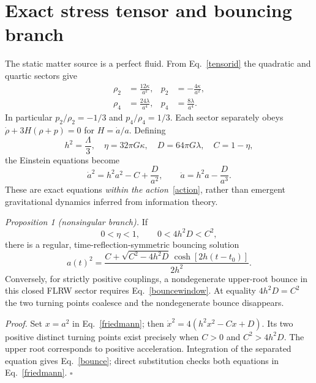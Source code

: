 \documentclass[aps,prd,reprint,longbibliography,nofootinbib,superscriptaddress]{revtex4-2}
\begin{document}
\section{Exact stress tensor and bouncing branch}
The static matter source is a perfect fluid. From Eq.~\eqref{tensorid} the quadratic and quartic sectors give
\begin{align}\label{rho}
\rho_2&=\frac{12\kappa}{a^2},&p_2&=-\frac{4\kappa}{a^2},\\
\rho_4&=\frac{24\lambda}{a^4},&p_4&=\frac{8\lambda}{a^4}.
\end{align}
In particular $p_2/\rho_2=-1/3$ and $p_4/\rho_4=1/3$. Each sector separately obeys $\dot\rho+3H(\rho+p)=0$ for $H=\dot a/a$. Defining
\begin{equation}\label{const}
 h^2=\frac\Lambda3,\quad \eta=32\pi G\kappa,\quad
 D=64\pi G\lambda,\quad C=1-\eta,
\end{equation}
the Einstein equations become
\begin{equation}\label{friedmann}
 \dot a^2=h^2 a^2-C+\frac{D}{a^2},\qquad
 \ddot a=h^2 a-\frac{D}{a^3}.
\end{equation}
These are exact equations \emph{within the action}~\eqref{action}, rather than emergent gravitational dynamics inferred from information theory.

\textit{Proposition 1 (nonsingular branch).} If
\begin{equation}\label{bouncewindow}
 0<\eta<1,\qquad 0<4h^2D<C^2,
\end{equation}
there is a regular, time-reflection-symmetric bouncing solution
\begin{equation}\label{bounce}
 a(t)^2=\frac{C+\sqrt{C^2-4h^2D}\,\cosh[2h(t-t_0)]}{2h^2}.
\end{equation}
Conversely, for strictly positive couplings, a nondegenerate upper-root bounce in this closed FLRW sector requires Eq.~\eqref{bouncewindow}. At equality $4h^2D=C^2$ the two turning points coalesce and the nondegenerate bounce disappears.

\textit{Proof.} Set $x=a^2$ in Eq.~\eqref{friedmann}; then $\dot x^2=4(h^2x^2-Cx+D)$. Its two positive distinct turning points exist precisely when $C>0$ and $C^2>4h^2D$. The upper root corresponds to positive acceleration. Integration of the separated equation gives Eq.~\eqref{bounce}; direct substitution checks both equations in Eq.~\eqref{friedmann}. $\square$
\end{document}
